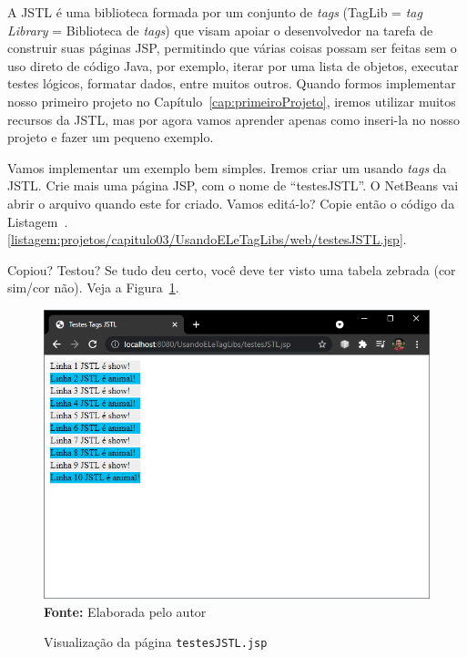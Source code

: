 A JSTL é uma biblioteca formada por um conjunto de \textit{tags} (TagLib = \textit{tag} \textit{Library} = Biblioteca de \textit{tags}) que visam apoiar o desenvolvedor na tarefa de construir suas páginas JSP, permitindo que várias coisas possam ser feitas sem o uso direto de código Java, por exemplo, iterar por uma lista de objetos, executar testes lógicos, formatar dados, entre muitos outros. Quando formos implementar nosso primeiro projeto no Capítulo~\ref{cap:primeiroProjeto}, iremos utilizar muitos recursos da JSTL, mas por agora vamos aprender apenas como inseri-la no nosso projeto e fazer um pequeno exemplo.

Vamos implementar um exemplo bem simples. Iremos criar um  usando \textit{tags} da JSTL. Crie mais uma página JSP, com o nome de ``testesJSTL''. O NetBeans vai abrir o arquivo quando este for criado. Vamos editá-lo? Copie então o código da Listagem~\thechapter.\ref{listagem:projetos/capitulo03/UsandoELeTagLibs/web/testesJSTL.jsp}.


Copiou? Testou? Se tudo deu certo, você deve ter visto uma tabela zebrada (cor sim/cor não). Veja a Figura~\ref{fig:cap03VisualizacaoTestesJSTL}.

\FloatBarrier
\begin{figure}[!htbp]
    \centering
    \caption{Visualização da página \texttt{testesJSTL.jsp}}
    \includegraphics[scale=0.7]{imagens/cap03VisualizacaoTestesJSTL}
    \\\textbf{Fonte:} Elaborada pelo autor
    \label{fig:cap03VisualizacaoTestesJSTL}
\end{figure}
\FloatBarrier

